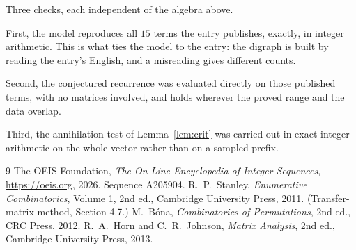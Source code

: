 \documentclass[11pt,a4paper]{article}
\theoremstyle{plain}
\theoremstyle{definition}
\begin{document}
Three checks, each independent of the algebra above.

First, the model reproduces all $15$ terms the entry publishes, exactly, in integer
arithmetic. This is what ties the model to the entry: the digraph is built by reading the
entry's English, and a misreading gives different counts.

Second, the conjectured recurrence was evaluated directly on those published terms, with no
matrices involved, and holds wherever the proved range and the data overlap.

Third, the annihilation test of Lemma~\ref{lem:crit} was carried out in exact integer
arithmetic on the whole vector rather than on a sampled prefix.

\begin{thebibliography}{9}
 The OEIS Foundation, \emph{The On-Line Encyclopedia of Integer
Sequences}, \url{https://oeis.org}, 2026. Sequence A205904.
 R.~P.~Stanley, \emph{Enumerative Combinatorics}, Volume 1, 2nd ed.,
Cambridge University Press, 2011. (Transfer-matrix method, Section 4.7.)
 M.~B\'ona, \emph{Combinatorics of Permutations}, 2nd ed., CRC
Press, 2012.
 R.~A.~Horn and C.~R.~Johnson, \emph{Matrix Analysis}, 2nd ed., Cambridge
University Press, 2013.
\end{thebibliography}
\end{document}
